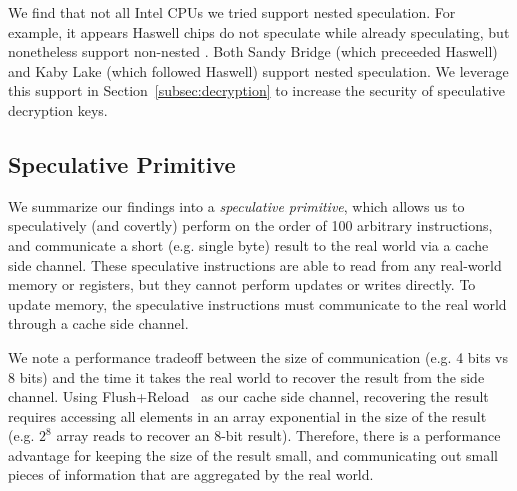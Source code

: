 We find that not all Intel CPUs we tried support nested speculation. For
example, it appears Haswell chips do not speculate while already speculating,
but nonetheless support non-nested \speculake. Both Sandy Bridge (which
preceeded Haswell) and Kaby Lake (which followed Haswell) support nested
speculation.
We leverage this support in Section~\ref{subsec:decryption} to
increase the security of speculative decryption keys.


\subsection{Speculative Primitive}

We summarize our findings into a \emph{speculative primitive}, which allows us to
speculatively (and covertly) perform on the order of 100 arbitrary
instructions, and communicate a short (e.g. single byte) result to the real
world via a cache side channel. These speculative instructions are able to read
from any real-world memory or registers, but they cannot perform updates or
writes directly. To update memory, the speculative instructions must communicate
to the real world through a cache side channel.

We note a performance tradeoff between the size of communication (e.g. 4 bits vs 8
bits) and the time it takes the real world to recover the result from the side
channel. Using Flush+Reload~\cite{yarom2014flush+} as our cache side channel,
recovering the result requires accessing all elements in an array exponential in
the size of the result (e.g. $2^8$ array reads to recover an 8-bit result). 
Therefore, there is a
performance advantage for keeping the size of the result small, and communicating
out small pieces of information that are aggregated by the real world.


